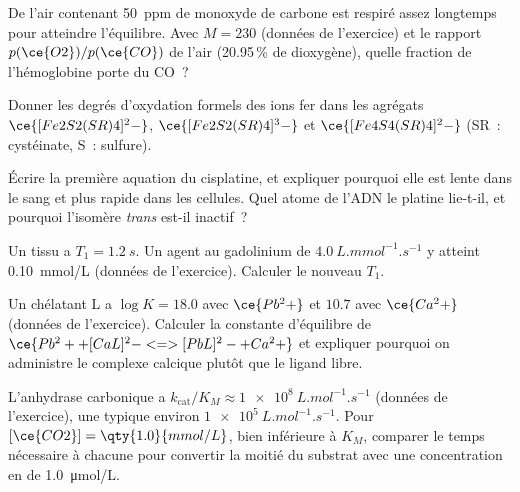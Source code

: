 \begin{exercise}[$\star\star$]\label{exo:b3:bioinorganic:6}
De l'air contenant \qty{50}{ppm} de monoxyde de carbone est respiré assez longtemps pour atteindre
l'équilibre. Avec $M = 230$ (données de l'exercice) et le rapport $p(\ce{O2})/p(\ce{CO})$ de l'air
(20.95\,\% de dioxygène), quelle fraction de l'hémoglobine porte du CO~?
\end{exercise}

\begin{exercise}[$\star\star$]\label{exo:b3:bioinorganic:7}
Donner les degrés d'oxydation formels des ions fer dans les agrégats $\ce{[Fe2S2(SR)4]^2-}$,
$\ce{[Fe2S2(SR)4]^3-}$ et $\ce{[Fe4S4(SR)4]^2-}$ (SR~: cystéinate, S~: sulfure).
\end{exercise}

\begin{exercise}[$\star\star$]\label{exo:b3:bioinorganic:8}
Écrire la première aquation du cisplatine, et expliquer pourquoi elle est
lente dans le sang et plus rapide dans les cellules. Quel atome de l'ADN le
platine lie-t-il, et pourquoi l'isomère \textit{trans} est-il inactif~?
\end{exercise}

\begin{exercise}[$\star\star$]\label{exo:b3:bioinorganic:9}
Un tissu a $T_1 = \qty{1.2}{s}$. Un agent au gadolinium de  $\qty{4.0}{L.mmol^{-1}.s^{-1}}$ y atteint \qty{0.10}{mmol/L}
(données de l'exercice). Calculer le nouveau $T_1$.
\end{exercise}

\begin{exercise}[$\star\star\star$]\label{exo:b3:bioinorganic:10}
Un chélatant L a $\log K = 18.0$ avec $\ce{Pb^2+}$ et $10.7$ avec $\ce{Ca^2+}$ (données de l'exercice).
Calculer la constante d'équilibre de $\ce{Pb^2+ + [CaL]^2- <=> [PbL]^2- + Ca^2+}$ et expliquer pourquoi on administre le
complexe calcique plutôt que le ligand libre.
\end{exercise}

\begin{exercise}[$\star\star\star$]\label{exo:b3:bioinorganic:11}
L'anhydrase carbonique a $k_{\mathrm{cat}}/K_M \approx \qty{1e8}{L.mol^{-1}.s^{-1}}$ (données de l'exercice), une  typique environ
$\qty{1e5}{L.mol^{-1}.s^{-1}}$. Pour $[\ce{CO2}] = \qty{1.0}{mmol/L}$, bien inférieure à $K_M$, comparer le temps nécessaire à chacune pour convertir la moitié
du substrat avec une concentration en  de \qty{1.0}{\micro mol/L}.
\end{exercise}

